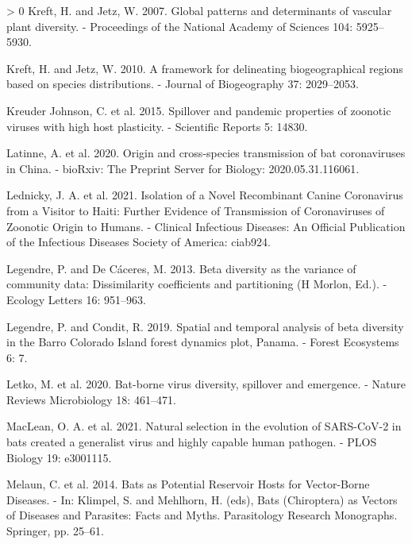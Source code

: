\documentclass[11pt]{article}
\newlength{\cslhangindent}
\newenvironment{CSLReferences}[3] %
 {%
  \setlength{\parindent}{0pt}
  \ifodd #1 \everypar{\setlength{\hangindent}{\cslhangindent}}\ignorespaces\fi
  \ifnum #2 > 0
  \setlength{\parskip}{#2\baselineskip}
  \fi
 }%
 {}
\begin{document}
\begin{CSLReferences}{1}{0}
\leavevmode\hypertarget{ref-Kreft2007GloPat}{}%
Kreft, H. and Jetz, W. 2007. Global patterns and determinants of
vascular plant diversity. - Proceedings of the National Academy of
Sciences 104: 5925--5930.

\leavevmode\hypertarget{ref-Kreft2010FraDel}{}%
Kreft, H. and Jetz, W. 2010. A framework for delineating biogeographical
regions based on species distributions. - Journal of Biogeography 37:
2029--2053.

\leavevmode\hypertarget{ref-KreuderJohnson2015SpiPan}{}%
Kreuder Johnson, C. et al. 2015. Spillover and pandemic properties of
zoonotic viruses with high host plasticity. - Scientific Reports 5:
14830.

\leavevmode\hypertarget{ref-Latinne2020OriCro}{}%
Latinne, A. et al. 2020. Origin and cross-species transmission of bat
coronaviruses in China. - bioRxiv: The Preprint Server for Biology:
2020.05.31.116061.

\leavevmode\hypertarget{ref-Lednicky2021IsoNov}{}%
Lednicky, J. A. et al. 2021. Isolation of a Novel Recombinant Canine
Coronavirus from a Visitor to Haiti: Further Evidence of Transmission of
Coronaviruses of Zoonotic Origin to Humans. - Clinical Infectious
Diseases: An Official Publication of the Infectious Diseases Society of
America: ciab924.

\leavevmode\hypertarget{ref-Legendre2013BetDiv}{}%
Legendre, P. and De Cáceres, M. 2013. Beta diversity as the variance of
community data: Dissimilarity coefficients and partitioning (H Morlon,
Ed.). - Ecology Letters 16: 951--963.

\leavevmode\hypertarget{ref-Legendre2019SpaTem}{}%
Legendre, P. and Condit, R. 2019. Spatial and temporal analysis of beta
diversity in the Barro Colorado Island forest dynamics plot, Panama. -
Forest Ecosystems 6: 7.

\leavevmode\hypertarget{ref-Letko2020BatVir}{}%
Letko, M. et al. 2020. Bat-borne virus diversity, spillover and
emergence. - Nature Reviews Microbiology 18: 461--471.

\leavevmode\hypertarget{ref-MacLean2021NatSel}{}%
MacLean, O. A. et al. 2021. Natural selection in the evolution of
SARS-CoV-2 in bats created a generalist virus and highly capable human
pathogen. - PLOS Biology 19: e3001115.

\leavevmode\hypertarget{ref-Melaun2014BatPot}{}%
Melaun, C. et al. 2014. Bats as Potential Reservoir Hosts for
Vector-Borne Diseases. - In: Klimpel, S. and Mehlhorn, H. (eds), Bats
(Chiroptera) as Vectors of Diseases and Parasites: Facts and Myths.
Parasitology Research Monographs. Springer, pp. 25--61.


\end{CSLReferences}
\end{document}
